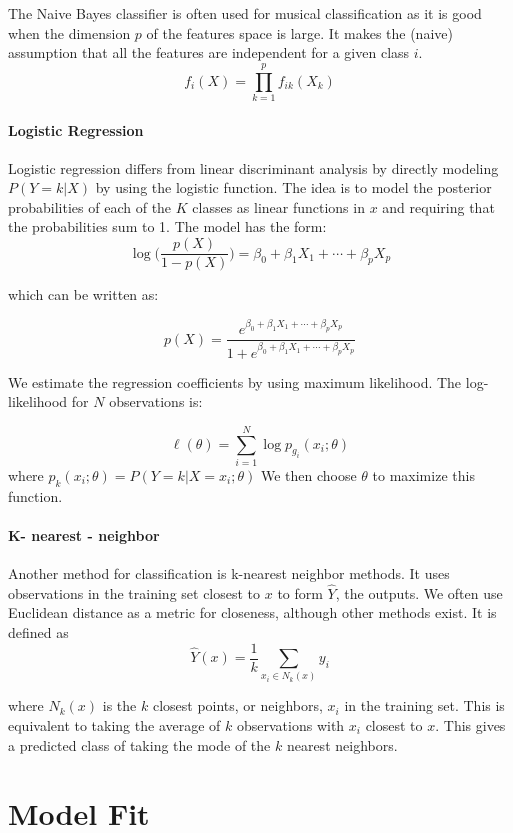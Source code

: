 \documentclass[12pt,twoside]{reedthesis}
\theoremstyle{definition}
\theoremstyle{definition}
\theoremstyle{definition}
\theoremstyle{remark}
\begin{document}
The Naive Bayes classifier is often used for musical classification as
it is good when the dimension \(p\) of the features space is large. It
makes the (naive) assumption that all the features are independent for a
given class \(i\). \[f_i(X) = \prod_{k = 1}^p f_{ik}(X_k)\]

\subsubsection{Logistic Regression}\label{logistic-regression}

Logistic regression differs from linear discriminant analysis by
directly modeling \(P(Y = k|X)\) by using the logistic function. The
idea is to model the posterior probabilities of each of the \(K\)
classes as linear functions in \(x\) and requiring that the
probabilities sum to 1. The model has the form:
\[ \log \bigg( \frac{p(X)}{1-p(X)} \bigg) = \beta_0 + \beta_1 X_1 + \cdots + \beta_pX_p\]

which can be written as:

\[ p(X) = \frac{e^{\beta_0 + \beta_1X_1 + \cdots + \beta_pX_p}}{1 +e^{\beta_0 + \beta_1X_1 + \cdots + \beta_pX_p} }\]

We estimate the regression coefficients by using maximum likelihood. The
log-likelihood for \(N\) observations is:

\[ \ell(\theta) = \sum_{i = 1}^N \log p_{g_i}(x_i;\theta)\] where
\(p_k(x_i;\theta) = P(Y = k|X = x_i;\theta)\) We then choose \(\theta\)
to maximize this function.

\subsubsection{K- nearest - neighbor}\label{k--nearest---neighbor}

Another method for classification is k-nearest neighbor methods. It uses
observations in the training set closest to \(x\) to form \(\hat{Y}\),
the outputs. We often use Euclidean distance as a metric for closeness,
although other methods exist. It is defined as
\[ \hat{Y}(x) = \frac{1}{k}\sum_{x_i \in N_k(x)}y_i\]

where \(N_k(x)\) is the \(k\) closest points, or neighbors, \(x_i\) in
the training set. This is equivalent to taking the average of \(k\)
observations with \(x_i\) closest to \(x\). This gives a predicted class
of taking the mode of the \(k\) nearest neighbors.

\chapter{Model Fit}\label{model-fit}
\end{document}
